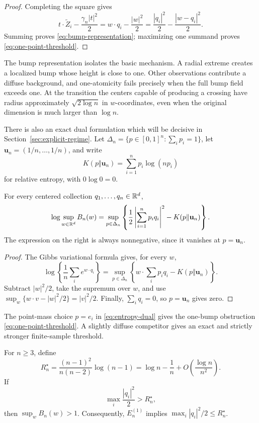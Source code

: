 \begin{proof}
Completing the square gives
\[
  t\cdot\widetilde Z_i-\frac{\gamma_n|t|^2}{2}
  =
  w\cdot q_i-\frac{|w|^2}{2}
  =
  \frac{|q_i|^2}{2}-\frac{|w-q_i|^2}{2}.
\]
Summing proves \eqref{eq:bump-representation}; maximizing one summand proves
\eqref{eq:one-point-threshold}.
\end{proof}

The bump representation isolates the basic mechanism. A radial extreme creates a
localized bump whose height is close to one. Other observations contribute a
diffuse background, and one-atomicity fails precisely when the full bump field
exceeds one. At the transition the centers capable of producing a crossing have
radius approximately \(\sqrt{2\log n}\) in \(w\)-coordinates, even when the
original dimension is much larger than \(\log n\).

There is also an exact dual formulation which will be decisive in
Section~\ref{sec:explicit-regime}. Let
\(\Delta_n=\{p\in[0,1]^n:\sum_i p_i=1\}\), let
\(\mathbf u_n=(1/n,\ldots,1/n)\), and write
\[
  K(p\Vert \mathbf u_n)=\sum_{i=1}^n p_i\log(np_i)
\]
for relative entropy, with \(0\log0=0\).

\begin{lemma}
\label{lem:entropy-dual}
For every centered collection \(q_1,\ldots,q_n\in\mathbb R^d\),
\begin{equation}
\label{eq:entropy-dual}
  \log\sup_{w\in\mathbb R^d}B_n(w)
  =
  \sup_{p\in\Delta_n}
  \left\{
    \frac12\left|\sum_{i=1}^np_iq_i\right|^2
    -K(p\Vert \mathbf u_n)
  \right\}.
\end{equation}
The expression on the right is always nonnegative, since it vanishes at
\(p=\mathbf u_n\).
\end{lemma}

\begin{proof}
The Gibbs variational formula gives, for every \(w\),
\[
  \log\left\{\frac1n\sum_i e^{w\cdot q_i}\right\}
  =
  \sup_{p\in\Delta_n}
  \left\{w\cdot\sum_i p_iq_i-K(p\Vert \mathbf u_n)\right\}.
\]
Subtract \(|w|^2/2\), take the supremum over \(w\), and use
\(\sup_w\{w\cdot v-|w|^2/2\}=|v|^2/2\). Finally,
\(\sum_iq_i=0\), so \(p=\mathbf u_n\) gives zero.
\end{proof}

The point-mass choice \(p=e_i\) in \eqref{eq:entropy-dual} gives the
one-bump obstruction \eqref{eq:one-point-threshold}.  A slightly diffuse
competitor gives an exact and strictly stronger finite-sample threshold.

\begin{proposition}
\label{prop:potts-radial-obstruction}
For \(n\ge3\), define
\begin{equation}
\label{eq:potts-radial-threshold}
 R_n^\star
 =
 \frac{(n-1)^2}{n(n-2)}\log(n-1)
 =
 \log n-\frac1n+O\left(\frac{\log n}{n^2}\right).
\end{equation}
If
\[
 \max_i\frac{|q_i|^2}{2}>R_n^\star,
\]
then \(\sup_wB_n(w)>1\). Consequently, \(E_n^{(1)}\) implies
\(\max_i|q_i|^2/2\le R_n^\star\).
\end{proposition}


